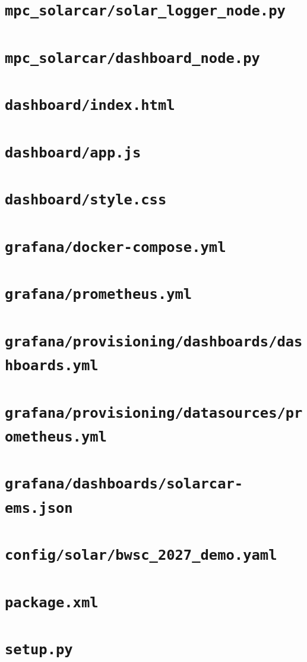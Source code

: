 \documentclass[a4paper,10pt,oneside]{book}
\begin{document}
\section{\texttt{mpc\_solarcar/solar\_logger\_node.py}}

\section{\texttt{mpc\_solarcar/dashboard\_node.py}}

\section{\texttt{dashboard/index.html}}

\section{\texttt{dashboard/app.js}}

\section{\texttt{dashboard/style.css}}

\section{\texttt{grafana/docker-compose.yml}}

\section{\texttt{grafana/prometheus.yml}}

\section{\texttt{grafana/provisioning/dashboards/dashboards.yml}}

\section{\texttt{grafana/provisioning/datasources/prometheus.yml}}

\section{\texttt{grafana/dashboards/solarcar-ems.json}}

\section{\texttt{config/solar/bwsc\_2027\_demo.yaml}}

\section{\texttt{package.xml}}

\section{\texttt{setup.py}}

\end{document}
